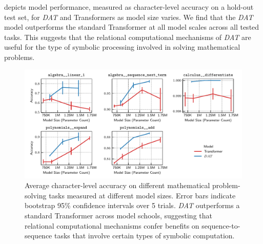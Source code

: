  depicts model performance, measured as character-level accuracy on a hold-out test set, for \textit{DAT} and Transformers as model size varies. We find that the \textit{DAT} model outperforms the standard Transformer at all model scales across all tested tasks. This suggests that the relational computational mechanisms of \textit{DAT} are useful for the type of symbolic processing involved in solving mathematical problems.




\begin{figure}[t]
    \includegraphics[width=\textwidth]{figs/experiments/math/math_accuracy_scaling.pdf}
    \caption{Average character-level accuracy on different mathematical problem-solving tasks measured at different model sizes. Error bars indicate bootstrap 95\% confidence intervals over 5 trials. \textit{DAT} outperforms a standard Transformer across model schools, suggesting that relational computational mechanisms confer benefits on sequence-to-sequence tasks that involve certain types of symbolic computation.}\label{fig:math_scaling}
\end{figure}

